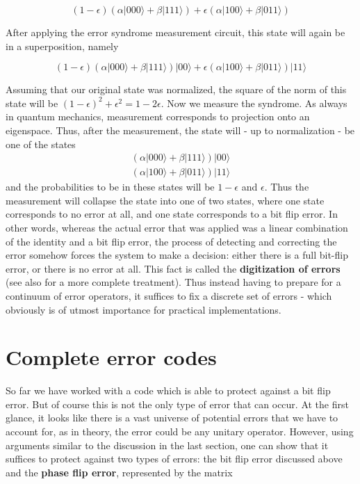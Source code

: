 \documentclass[a4paper, draft]{article}
\theoremstyle{own}
\theoremstyle{remark}
\begin{document}
$$
(1-\epsilon)(\alpha |000 \rangle + \beta |111 \rangle) + \epsilon (\alpha |100 \rangle + \beta |011\rangle)
$$

After applying the error syndrome measurement circuit, this state will again be in a superposition, namely 

$$
(1-\epsilon)(\alpha |000 \rangle + \beta |111 \rangle)|00\rangle + \epsilon (\alpha |100 \rangle + \beta |011\rangle) |11 \rangle
$$

Assuming that our original state was normalized, the square of the norm of this state will be $(1-\epsilon)^2 + \epsilon^2 = 1 - 2\epsilon$. Now we measure the syndrome. As always in quantum mechanics, measurement corresponds to projection onto an eigenspace. Thus, after the measurement, the state will - up to normalization - be one of the states
\begin{align*}
(\alpha |000 \rangle + \beta |111 \rangle)|00\rangle \\
(\alpha |100 \rangle + \beta |011\rangle) |11 \rangle
\end{align*}
and the probabilities to be in these states will be $1-\epsilon$ and $\epsilon$. Thus the measurement will collapse the state into one of two states, where one state corresponds to no error at all, and one state corresponds to a bit flip error. In other words, whereas the actual error that was applied was a linear combination of the identity and a bit flip error, the process of detecting and correcting the error somehow forces the system to make a decision: either there is a full bit-flip error, or there is no error at all. This fact is called the {\bf digitization of errors} (see also \cite{Steane} for a more complete treatment). Thus instead having to prepare for a continuum of error operators, it suffices to fix a discrete set of errors - which obviously is of utmost importance for practical implementations.



\section{Complete error codes}

So far we have worked with a code which is able to protect against a bit flip error. But of course this is not the only type of error that can occur. At the first glance, it looks like there is a vast universe of potential errors that we have to account for, as in theory, the error could be any unitary operator. However, using arguments similar to the discussion in the last section, one can show that it suffices to protect against two types of errors: the bit flip error discussed above and the {\bf phase flip error}, represented by the matrix
\end{document}
